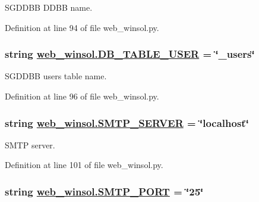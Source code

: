 SGDDBB DDBB name. 



Definition at line 94 of file web\_\-winsol.py.\hypertarget{namespaceweb__winsol_d199e10256098a9ead9451cb224d92ad}{
\subsubsection[DB\_\-TABLE\_\-USER]{\setlength{\rightskip}{0pt plus 5cm}string \hyperlink{namespaceweb__winsol_d199e10256098a9ead9451cb224d92ad}{web\_\-winsol.DB\_\-TABLE\_\-USER} = \char`\"{}\_\-users\char`\"{}}}
\label{namespaceweb__winsol_d199e10256098a9ead9451cb224d92ad}


SGDDBB users table name. 



Definition at line 96 of file web\_\-winsol.py.\hypertarget{namespaceweb__winsol_56b91d3eaf088a06f26e7f5bbc74f8b9}{
\subsubsection[SMTP\_\-SERVER]{\setlength{\rightskip}{0pt plus 5cm}string \hyperlink{namespaceweb__winsol_56b91d3eaf088a06f26e7f5bbc74f8b9}{web\_\-winsol.SMTP\_\-SERVER} = \char`\"{}localhost\char`\"{}}}
\label{namespaceweb__winsol_56b91d3eaf088a06f26e7f5bbc74f8b9}


SMTP server. 



Definition at line 101 of file web\_\-winsol.py.\hypertarget{namespaceweb__winsol_66d26cb466b69ea1a7049aee2309f318}{
\subsubsection[SMTP\_\-PORT]{\setlength{\rightskip}{0pt plus 5cm}string \hyperlink{namespaceweb__winsol_66d26cb466b69ea1a7049aee2309f318}{web\_\-winsol.SMTP\_\-PORT} = \char`\"{}25\char`\"{}}}
\label{namespaceweb__winsol_66d26cb466b69ea1a7049aee2309f318}


